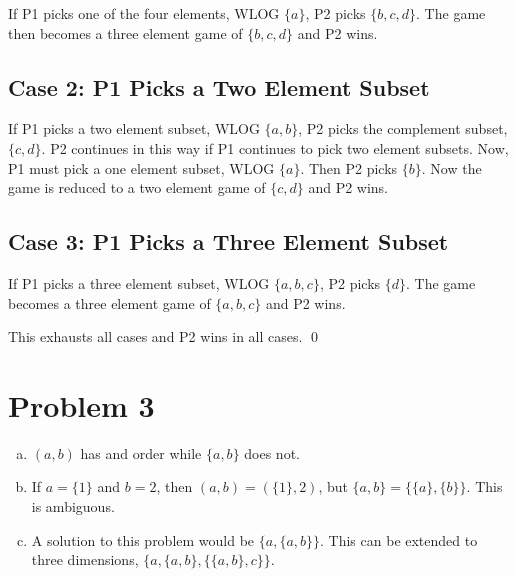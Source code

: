 \documentclass{article}
\begin{document}
If P1 picks one of the four elements, WLOG $\{a\}$, P2 picks $\{b, c, d\}$. The
game then becomes a three element game of $\{b, c, d\}$ and P2 wins.

\subsection*{Case 2: P1 Picks a Two Element Subset}

If P1 picks a two element subset, WLOG $\{a, b\}$, P2 picks the complement
subset, $\{c, d\}$. P2 continues in this way if P1 continues to pick two element
subsets. Now, P1 must pick a one element subset, WLOG $\{a\}$. Then P2 picks
$\{b\}$. Now the game is reduced to a two element game of $\{c, d\}$ and P2
wins.

\subsection*{Case 3: P1 Picks a Three Element Subset}

If P1 picks a three element subset, WLOG $\{a, b, c\}$, P2 picks $\{d\}$. The
game becomes a three element game of $\{a, b, c\}$ and P2 wins.

\bigbreak

This exhausts all cases and P2 wins in all cases. \qed

\section*{Problem 3}

\begin{enumerate}[a.]
  \item $(a, b)$ has and order while $\{a, b\}$ does not.
  \item If $a = \{1\}$ and $b = 2$, then $(a, b) = (\{1\}, 2)$, but
    $\{a,{b}\} = \{\{a\},\{b\}\}$. This is ambiguous.
  \item A solution to this problem would be $\{a,\{a, b\}\}$. This can be
    extended to three dimensions, $\{a,\{a,b\},\{\{a,b\},c\}\}$.
\end{enumerate}
\end{document}
